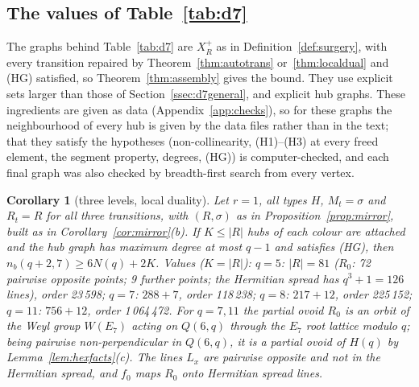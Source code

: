 \documentclass[11pt]{amsart}
\newtheorem{corollary}[theorem]{Corollary}
\theoremstyle{definition}
\theoremstyle{remark}
\numberwithin{equation}{section}
\newcommand{\nb}{n_b}
\begin{document}
\subsection{The values of Table~\ref{tab:d7}}\label{ssec:d7records}
The graphs behind Table~\ref{tab:d7} are $X^+_R$ as in Definition~\ref{def:surgery}, with every transition repaired by
Theorem~\ref{thm:autotrans} or~\ref{thm:localdual} and (HG) satisfied, so Theorem~\ref{thm:assembly} gives the bound. They
use explicit sets larger than those of Section~\ref{ssec:d7general}, and explicit hub graphs. These ingredients are given
as data (Appendix~\ref{app:checks}), so for these graphs the neighbourhood of every hub is given by the data files rather
than in the text; that they satisfy the hypotheses (non-collinearity, (H1)--(H3) at every freed
element, the segment property, degrees, (HG)) is computer-checked, and each final graph was also checked by breadth-first
search from every vertex.

\begin{corollary}[three levels, local duality]\label{cor:rec-81}
Let $r=1$, all types $H$, $M_t=\sigma$ and $R_t=R$ for all three transitions, with $(R,\sigma)$ as in
Proposition~\ref{prop:mirror}, built as in Corollary~\ref{cor:mirror}(b). If $K\le|R|$ hubs of each colour are attached
and the hub graph has maximum degree at most $q-1$ and satisfies (HG), then $\nb(q+2,7)\ge6N(q)+2K$. Values ($K=|R|$):
$q=5$: $|R|=81$ ($R_0$: 72 pairwise opposite points; 9 further points; the Hermitian spread has $q^3+1=126$ lines), order
23\,598; $q=7$: $288+7$, order 118\,238; $q=8$: $217+12$, order 225\,152; $q=11$: $756+12$, order 1\,064\,472. For $q=7,11$ the
partial ovoid $R_0$ is an orbit of the Weyl group $W(E_7)$ acting on $Q(6,q)$ through the $E_7$ root lattice modulo $q$; being
pairwise non-perpendicular in $Q(6,q)$, it is a partial ovoid of $H(q)$ by Lemma~\ref{lem:hexfacts}(c). The lines $L_x$ are
pairwise opposite and not in the Hermitian spread, and $f_0$ maps $R_0$ onto Hermitian spread lines.
\end{corollary}
\end{document}
